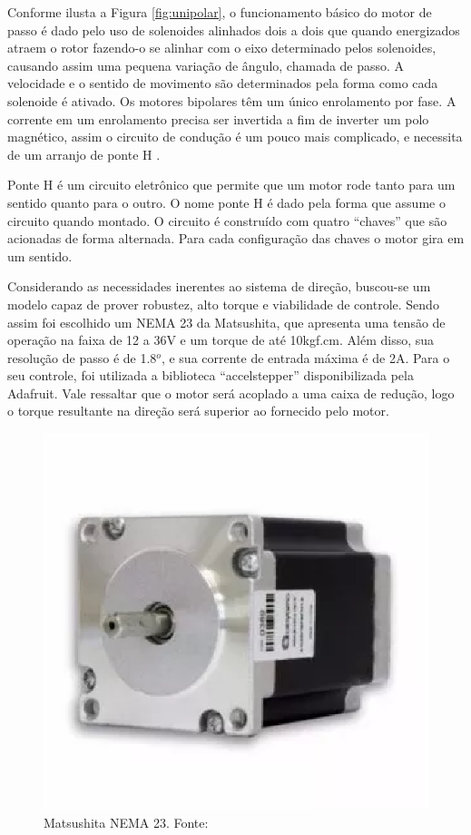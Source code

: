     Conforme ilusta a Figura \ref{fig:unipolar}, o funcionamento básico do motor de passo é dado pelo uso de solenoides alinhados dois a dois que quando energizados atraem o rotor fazendo-o se alinhar com o eixo determinado pelos solenoides, causando assim uma pequena variação de ângulo, chamada de passo. A velocidade e o sentido de movimento são determinados pela forma como cada solenoide é ativado. Os motores bipolares têm um único enrolamento por fase. A corrente em um enrolamento precisa ser invertida a fim de inverter um polo magnético, assim o circuito de condução é um pouco mais complicado, e necessita de um arranjo de ponte H \cite{brites}.
    
    Ponte H é um circuito eletrônico que permite que um motor rode tanto para um sentido quanto para o outro. O nome ponte H é dado pela forma que assume o circuito quando montado. O circuito é construído com quatro “chaves” que são acionadas de forma alternada. Para cada configuração das chaves o motor gira em um sentido.
    
    Considerando as necessidades inerentes ao sistema de direção, buscou-se um modelo capaz de prover robustez, alto torque e viabilidade de controle. Sendo assim foi escolhido um NEMA 23 da Matsushita, que apresenta uma tensão de operação na faixa de 12 a 36V e um torque de até 10kgf.cm. Além disso, sua resolução de passo é de 1.8$^o$, e sua corrente de entrada máxima é de 2A. Para o seu controle, foi utilizada a biblioteca “accelstepper” disponibilizada pela Adafruit. Vale ressaltar que o motor será acoplado a uma caixa de redução, logo o torque resultante na direção será superior ao fornecido pelo motor. 
    
            \begin{figure}[h]
            	\centering
            	\includegraphics[keepaspectratio=true, scale=1]{figuras/matsu.eps}
            	\caption{Matsushita NEMA 23. Fonte: \cite{bde}}
            	\label{fig:matsu}
            \end{figure}
    
